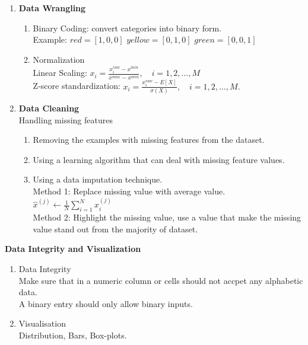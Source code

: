 \begin{enumerate}
    \item \textbf{Data Wrangling}
    \begin{enumerate}
        \item Binary Coding: convert categories into binary form.\\
        Example: $red = [1,0,0]$ $yellow = [0,1,0]$ $green = [0,0,1]$ 
        \item Normalization \\
        Linear Scaling: $\displaystyle x_i = \frac{x_i^{raw}-x^{min}}{x^{max}-x^{min}}, \quad i = 1,2,\ldots,M$ \\
        Z-score standardization: $\displaystyle x_i = \frac{x_i^{raw}-E[X]}{\sigma(X)},\quad i = 1,2,\ldots,M.$
    \end{enumerate}
    \item \textbf{Data Cleaning}\\
    Handling missing features
        \begin{enumerate}
            \item Removing the examples with missing features from the dataset.
            \item Using a learning algorithm that can deal with missing feature values.
            \item Using a data imputation technique.\\
            Method 1: Replace missing value with average value.\\
            $\displaystyle \hat{x}^{(j)} \leftarrow \frac{1}{N} \sum_{i=1}^{N} x_i^{(j)}$ \\
            Method 2: Highlight the missing value, use a value that make the missing value stand out from the majority of dataset.
        \end{enumerate}
    \end{enumerate}
\textbf{Data Integrity and Visualization}
\begin{enumerate}
    \item Data Integrity \\ 
    Make sure that in a numeric column or cells should not accpet any alphabetic data.\\
    A binary entry should only allow binary inputs.
    \item Visualisation \\
    Distribution, Bars, Box-plots.
\end{enumerate}
